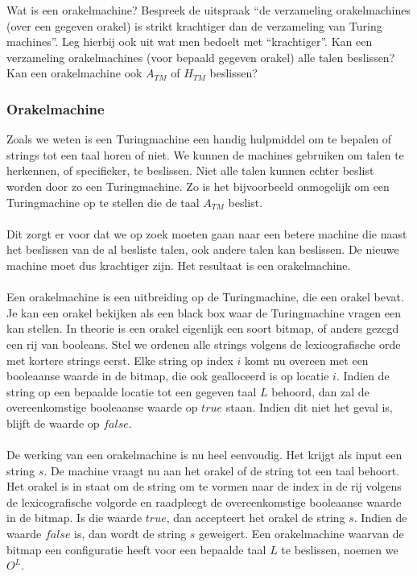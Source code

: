 \begin{question}
	Wat is een orakelmachine? Bespreek de uitspraak ``de verzameling orakelmachines (over een gegeven orakel) is strikt krachtiger dan de verzameling van Turing machines''. Leg hierbij ook uit wat men bedoelt met ``krachtiger''. Kan een verzameling orakelmachines (voor bepaald gegeven orakel) alle talen beslissen? Kan een orakelmachine ook $A_{TM}$ of $H_{TM}$ beslissen?
\end{question}

\subsubsection*{Orakelmachine}

Zoals we weten is een Turingmachine een handig hulpmiddel om te bepalen of strings tot een taal horen of niet. We kunnen de machines gebruiken om talen te herkennen, of specifieker, te beslissen. Niet alle talen kunnen echter beslist worden door zo een Turingmachine. Zo is het bijvoorbeeld onmogelijk om een Turingmachine op te stellen die de taal $A_{TM}$ beslist.
\\\\
Dit zorgt er voor dat we op zoek moeten gaan naar een betere machine die naast het beslissen van de al besliste talen, ook andere talen kan beslissen. De nieuwe machine moet dus krachtiger zijn. Het resultaat is een orakelmachine.
\\\\
Een orakelmachine is een uitbreiding op de Turingmachine, die een orakel bevat. Je kan een orakel bekijken als een black box waar de Turingmachine vragen een kan stellen. In theorie is een orakel eigenlijk een soort bitmap, of anders gezegd een rij van booleans. Stel we ordenen alle strings volgens de lexicografische orde met kortere strings eerst. Elke string op index $i$ komt nu overeen met een booleaanse waarde in de bitmap, die ook gealloceerd is op locatie $i$. Indien de string op een bepaalde locatie tot een gegeven taal $L$ behoord, dan zal de overeenkomstige booleaanse waarde op $true$ staan. Indien dit niet het geval is, blijft de waarde op $false$.
\\\\
De werking van een orakelmachine is nu heel eenvoudig. Het krijgt als input een string $s$. De machine vraagt nu aan het orakel of de string tot een taal behoort. Het orakel is in staat om de string om te vormen naar de index in de rij volgens de lexicografische volgorde en raadpleegt de overeenkomstige booleaanse waarde in de bitmap. Is die waarde $true$, dan accepteert het orakel de string $s$. Indien de waarde $false$ is, dan wordt de string $s$ geweigert. Een orakelmachine waarvan de bitmap een configuratie heeft voor een bepaalde taal $L$ te beslissen, noemen we $O^L$.

